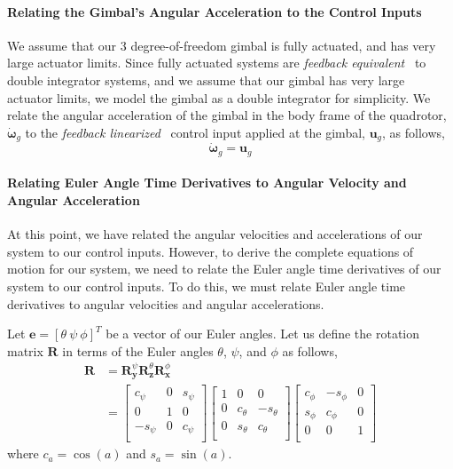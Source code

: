 \paragraph{Relating the Gimbal's Angular Acceleration to the Control Inputs}
We assume that our 3 degree-of-freedom gimbal is fully actuated, and has very large actuator limits. Since fully actuated systems are \emph{feedback equivalent}~\cite{tedrake:2016} to double integrator systems, and we assume that our gimbal has very large actuator limits, we model the gimbal as a double integrator for simplicity. We relate the angular acceleration of the gimbal in the body frame of the quadrotor, $\dot{\mathbf{\omega}}_g$ to the \emph{feedback linearized}~\cite{tedrake:2016} control input applied at the gimbal, $\mathbf{u}_g$, as follows,
%
\begin{equation}
\dot{\mathbf{\omega}}_g = \mathbf{u}_g
\label{eqn:ch2:u_g_short}
\end{equation}
%

\paragraph{Relating Euler Angle Time Derivatives to Angular Velocity and Angular Acceleration}

At this point, we have related the angular velocities and accelerations of our system to our control inputs.
However, to derive the complete equations of motion for our system, we need to relate the Euler angle time derivatives of our system to our control inputs.
To do this, we must relate Euler angle time derivatives to angular velocities and angular accelerations.

Let $\mathbf{e} = [ \theta ~ \psi ~ \phi ]^T$ be a vector of our Euler angles.
Let us define the rotation matrix $\mathbf{R}$ in terms of the Euler angles $\theta$, $\psi$, and $\phi$ as follows,
%
\begin{equation}
\begin{aligned}
%
\mathbf{R} & = \mathbf{R}_{\mathbf{y}}^{\psi} \mathbf{R}_{\mathbf{z}}^{\theta} \mathbf{R}_{\mathbf{x}}^{\phi} \\
& = 
\begin{bmatrix}
c_\psi  & 0 & s_\psi \\
0       & 1 & 0 \\
-s_\psi & 0 & c_\psi \\
\end{bmatrix}
\begin{bmatrix}
1 & 0        & 0 \\
0 & c_\theta & -s_\theta \\
0 & s_\theta & c_\theta \\
\end{bmatrix}
%
\begin{bmatrix}
c_\phi & -s_\phi & 0 \\
s_\phi & c_\phi  & 0 \\
0      & 0       & 1 \\
\end{bmatrix}
%
%
\end{aligned}
\end{equation}
%
where $c_a=\cos(a)$ and $s_a=\sin(a)$.

